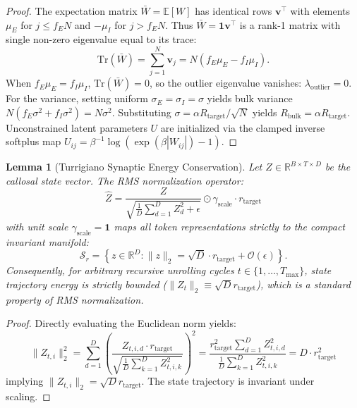 \documentclass[11pt,a4paper]{article}
\theoremstyle{plain}
\newtheorem{lemma}[theorem]{Lemma}
\theoremstyle{definition}
\theoremstyle{remark}
\newcommand{\Tr}{\mathrm{Tr}}
\begin{document}
\begin{proof}
The expectation matrix $\bar{W} = \mathbb{E}[W]$ has identical rows $\mathbf{v}^\top$ with elements $\mu_E$ for $j \le f_E N$ and $-\mu_I$ for $j > f_E N$. Thus $\bar{W} = \mathbf{1} \mathbf{v}^\top$ is a rank-1 matrix with single non-zero eigenvalue equal to its trace:
\begin{equation}
    \Tr(\bar{W}) = \sum_{j=1}^N \mathbf{v}_j = N(f_E \mu_E - f_I \mu_I).
\end{equation}
When $f_E \mu_E = f_I \mu_I$, $\Tr(\bar{W}) = 0$, so the outlier eigenvalue vanishes: $\lambda_{\mathrm{outlier}} = 0$. For the variance, setting uniform $\sigma_E = \sigma_I = \sigma$ yields bulk variance $N(f_E \sigma^2 + f_I \sigma^2) = N \sigma^2$. Substituting $\sigma = \alpha R_{\mathrm{target}} / \sqrt{N}$ yields $R_{\mathrm{bulk}} = \alpha R_{\mathrm{target}}$. Unconstrained latent parameters $U$ are initialized via the clamped inverse softplus map $U_{ij} = \beta^{-1} \log\left(\exp(\beta |W_{ij}|) - 1\right)$.
\end{proof}

\begin{lemma}[Turrigiano Synaptic Energy Conservation]
\label{lem:turrigiano_stability}
Let $Z \in \mathbb{R}^{B \times T \times D}$ be the callosal state vector. The RMS normalization operator:
\begin{equation}
    \hat{Z} = \frac{Z}{\sqrt{\frac{1}{D} \sum_{d=1}^D Z_d^2 + \epsilon}} \odot \gamma_{\mathrm{scale}} \cdot r_{\mathrm{target}}
\end{equation}
with unit scale $\gamma_{\mathrm{scale}} = \mathbf{1}$ maps all token representations strictly to the compact invariant manifold:
\begin{equation}
    \mathcal{S}_r = \left\{ z \in \mathbb{R}^D : \|z\|_2 = \sqrt{D} \cdot r_{\mathrm{target}} + \mathcal{O}(\epsilon) \right\}.
\end{equation}
Consequently, for arbitrary recursive unrolling cycles $t \in \{1, \dots, T_{\max}\}$, state trajectory energy is strictly bounded ($\|Z_t\|_2 \equiv \sqrt{D} r_{\mathrm{target}}$), which is a standard property of RMS normalization.
\end{lemma}

\begin{proof}
Directly evaluating the Euclidean norm yields:
\begin{equation}
    \|Z_{t, i}\|_2^2 = \sum_{d=1}^D \left( \frac{Z_{t, i, d} \cdot r_{\mathrm{target}}}{\sqrt{\frac{1}{D} \sum_{k=1}^D Z_{t, i, k}^2}} \right)^2 = \frac{r_{\mathrm{target}}^2 \sum_{d=1}^D Z_{t, i, d}^2}{\frac{1}{D} \sum_{k=1}^D Z_{t, i, k}^2} = D \cdot r_{\mathrm{target}}^2
\end{equation}
implying $\|Z_{t, i}\|_2 = \sqrt{D} r_{\mathrm{target}}$. The state trajectory is invariant under scaling.
\end{proof}
\end{document}
